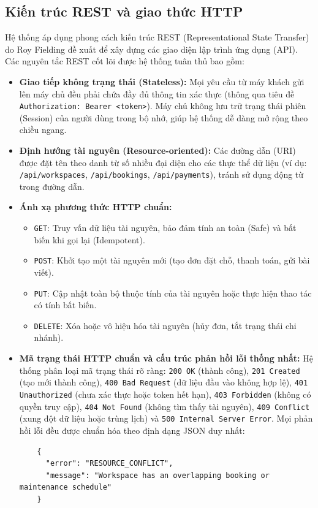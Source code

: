 \subsection{Kiến trúc REST và giao thức HTTP}
Hệ thống áp dụng phong cách kiến trúc REST (Representational State Transfer) do Roy Fielding đề xuất \cite{fielding2000rest} để xây dựng các giao diện lập trình ứng dụng (API). Các nguyên tắc REST cốt lõi được hệ thống tuân thủ bao gồm:
\begin{itemize}
    \item \textbf{Giao tiếp không trạng thái (Stateless):} Mọi yêu cầu từ máy khách gửi lên máy chủ đều phải chứa đầy đủ thông tin xác thực (thông qua tiêu đề \texttt{Authorization: Bearer <token>}). Máy chủ không lưu trữ trạng thái phiên (Session) của người dùng trong bộ nhớ, giúp hệ thống dễ dàng mở rộng theo chiều ngang.
    \item \textbf{Định hướng tài nguyên (Resource-oriented):} Các đường dẫn (URI) được đặt tên theo danh từ số nhiều đại diện cho các thực thể dữ liệu (ví dụ: \texttt{/api/workspaces}, \texttt{/api/bookings}, \texttt{/api/payments}), tránh sử dụng động từ trong đường dẫn.
    \item \textbf{Ánh xạ phương thức HTTP chuẩn:}
    \begin{itemize}
        \item \texttt{GET}: Truy vấn dữ liệu tài nguyên, bảo đảm tính an toàn (Safe) và bất biến khi gọi lại (Idempotent).
        \item \texttt{POST}: Khởi tạo một tài nguyên mới (tạo đơn đặt chỗ, thanh toán, gửi bài viết).
        \item \texttt{PUT}: Cập nhật toàn bộ thuộc tính của tài nguyên hoặc thực hiện thao tác có tính bất biến.
        \item \texttt{DELETE}: Xóa hoặc vô hiệu hóa tài nguyên (hủy đơn, tắt trạng thái chi nhánh).
    \end{itemize}
    \item \textbf{Mã trạng thái HTTP chuẩn và cấu trúc phản hồi lỗi thống nhất:} Hệ thống phân loại mã trạng thái rõ ràng: \texttt{200 OK} (thành công), \texttt{201 Created} (tạo mới thành công), \texttt{400 Bad Request} (dữ liệu đầu vào không hợp lệ), \texttt{401 Unauthorized} (chưa xác thực hoặc token hết hạn), \texttt{403 Forbidden} (không có quyền truy cập), \texttt{404 Not Found} (không tìm thấy tài nguyên), \texttt{409 Conflict} (xung đột dữ liệu hoặc trùng lịch) và \texttt{500 Internal Server Error}. Mọi phản hồi lỗi đều được chuẩn hóa theo định dạng JSON duy nhất:
    \begin{lstlisting}
    {
      "error": "RESOURCE_CONFLICT",
      "message": "Workspace has an overlapping booking or maintenance schedule"
    }
    \end{lstlisting}
\end{itemize}

